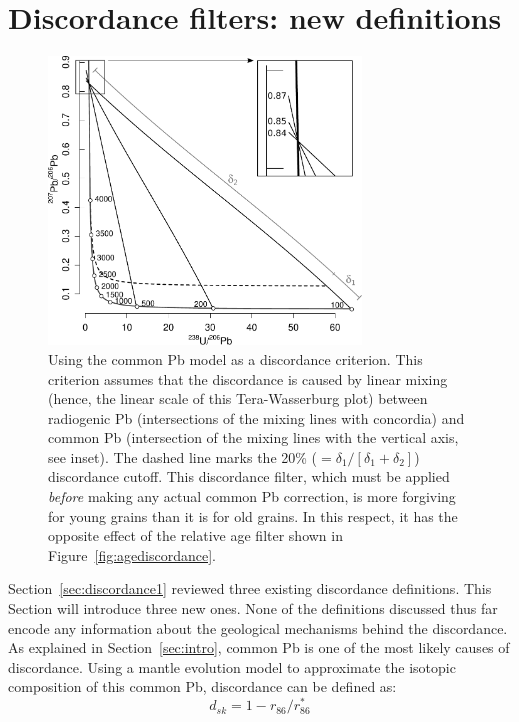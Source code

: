 \documentclass{article}
\begin{document}
\section{Discordance filters: new definitions}\label{sec:discordance2}

\begin{figure}[t]
  \includegraphics[width=8.3cm]{TW-sk.pdf}
    \caption{Using the \citet{stacey1975} common Pb model as a
      discordance criterion. This criterion assumes that the
      discordance is caused by linear mixing (hence, the linear scale
      of this Tera-Wasserburg plot) between radiogenic Pb
      (intersections of the mixing lines with concordia) and common Pb
      (intersection of the mixing lines with the vertical axis, see
      inset). The dashed line marks the 20\% ($=
      \delta_1/[\delta_1+\delta_2]$) discordance cutoff. This
      discordance filter, which must be applied \emph{before} making
      any actual common Pb correction, is more forgiving for young
      grains than it is for old grains. In this respect, it has the
      opposite effect of the relative age filter shown in
      Figure~\ref{fig:agediscordance}.  }
    \label{fig:SK}
\end{figure}

Section~\ref{sec:discordance1} reviewed three existing discordance
definitions.  This Section will introduce three new ones.  None of the
definitions discussed thus far encode any information about the
geological mechanisms behind the discordance. As explained in
Section~\ref{sec:intro}, common Pb is one of the most likely causes of
discordance. Using a mantle evolution model \citep[e.g.][]{stacey1975}
to approximate the isotopic composition of this common Pb, discordance
can be defined as:
\begin{equation}
  d_{sk} = 1 - r_{86}/r_{86}^\ast
  \label{eq:dsk}
\end{equation}
\end{document}
